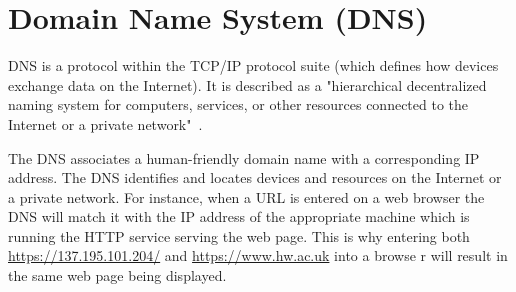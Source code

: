 \chapter{Domain Name System (DNS)}

DNS is a protocol within the TCP/IP protocol suite (which defines how
devices exchange data on the Internet). It is described as a "hierarchical
decentralized naming system for computers, services, or other resources
connected to the Internet or a private
network"~\cite{dnswiki}.

\vspace{0.5cm}

The DNS associates a human-friendly domain name with a corresponding IP
address. The DNS identifies and locates devices and resources on the Internet
or a private network. For instance, when a URL is entered on a web browser the
DNS will match it with the IP address of the appropriate machine which is
running the HTTP service serving the web page. This is why entering both
\url{https://137.195.101.204/} and \url{https://www.hw.ac.uk} into a browse
r will result in the same web page being displayed.
